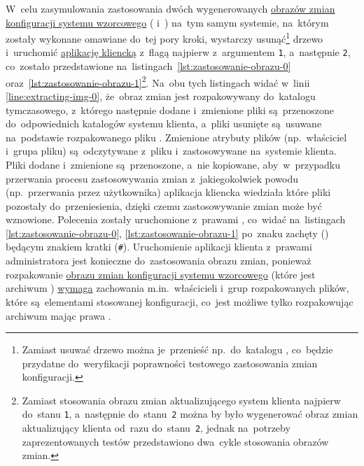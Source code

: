 \documentclass[thesis]{subfiles}
\begin{document}
W~celu zasymulowania zastosowania dwóch wygenerowanych \hyperref[sec:obraz-zmian-konfiguracji]{obrazów zmian konfiguracji systemu wzorcowego} ( i~) na~tym samym systemie, na~którym zostały wykonane omawiane do~tej pory kroki, wystarczy usunąć\footnote{Zamiast usuwać drzewo  można je~przenieść np.~do~katalogu , co~będzie przydatne do~weryfikacji poprawności testowego zastosowania zmian konfiguracji.} drzewo  i~uruchomić \hyperref[sec:cli-app]{aplikację kliencką} z~flagą  najpierw z~argumentem \texttt{1}, a~następnie \texttt{2}, co~zostało przedstawione na~listingach~\ref{lst:zastosowanie-obrazu-0} oraz~\ref{lst:zastosowanie-obrazu-1}\footnote{Zamiast stosowania obrazu zmian aktualizującego system klienta najpierw do~stanu \texttt{1}, a~następnie do~stanu~\texttt{2} można by było wygenerować obraz zmian aktualizujący klienta od~razu do~stanu~\texttt{2}, jednak na~potrzeby zaprezentowanych testów przedstawiono dwa~cykle stosowania obrazów zmian.}. Na~obu tych listingach widać w~linii \ref{line:extracting-img-0}, że~obraz zmian jest rozpakowywany do~katalogu tymczasowego, z~którego następnie dodane i~zmienione pliki są~przenoszone do~odpowiednich katalogów systemu klienta, a~pliki usunięte są~usuwane na~podstawie rozpakowanego pliku . Zmienione atrybuty plików (np.~właściciel i~grupa pliku) są~odczytywane z~pliku  i~zastosowywane na~systemie klienta. Pliki dodane i~zmienione są~przenoszone, a~nie kopiowane, aby~w~przypadku przerwania procesu zastosowywania zmian z~jakiegokolwiek powodu (np.~przerwania przez użytkownika) aplikacja kliencka wiedziała które pliki pozostały do~przeniesienia, dzięki czemu zastosowywanie zmian może być wznowione. Polecenia  zostały uruchomione z~prawami \superuser{}, co~widać na~listingach \ref{lst:zastosowanie-obrazu-0}, \ref{lst:zastosowanie-obrazu-1} po~znaku zachęty () będącym znakiem kratki (\texttt{\#}). Uruchomienie aplikacji klienta z~prawami administratora jest konieczne do~zastosowania obrazu zmian, ponieważ rozpakowanie \hyperref[sec:obraz-zmian-konfiguracji]{obrazu zmian konfiguracji systemu wzorcowego} (które jest archiwum \targz{}) \href{https://superuser.com/questions/838392/how-to-tar-a-directory-preserving-not-only-permissions-but-ownership-too}{wymaga} zachowania m.in.~właścicieli i~grup rozpakowanych plików, które są~elementami stosowanej konfiguracji, co~jest możliwe tylko rozpakowując archiwum mając prawa \superuser{}.
\end{document}
